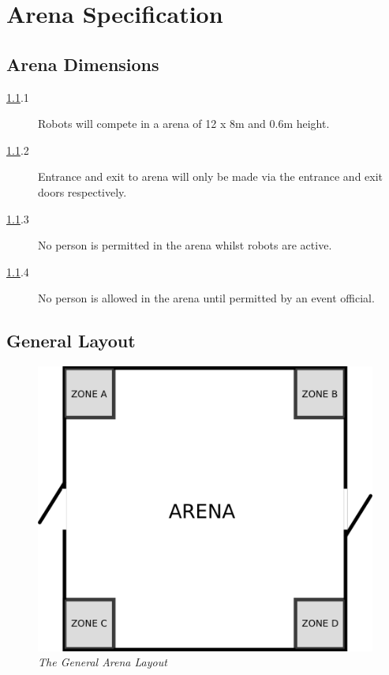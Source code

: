 \section {Arena Specification}

\subsection {Arena Dimensions}
\label{arena}

\begin {description}
\item [\ref{arena}.1] Robots will compete in a arena of 12 x 8m and 0.6m height.
\item [\ref{arena}.2] Entrance and exit to arena will only be made via the entrance and exit doors respectively.
\item [\ref{arena}.3] No person is permitted in the arena whilst robots are active.
\item [\ref{arena}.4] No person is allowed in the arena until permitted by an event official.
\end {description}

\subsection {General Layout}
\label{arenagenlay}

\begin {figure}[h]
\begin {center}
\includegraphics[keepaspectratio, scale =0.65]{../arena/arena.png}
\caption{\small{\emph{The General Arena Layout}}}
\label {fig:arena}
\end {center}
\end {figure}

